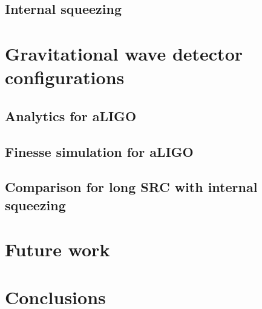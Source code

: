 \documentclass[pra,superscriptaddress,reprint,nofootinbib]{revtex4-1}
\begin{document}
\subsection{Internal squeezing}


\section{Gravitational wave detector configurations}
\subsection{Analytics for aLIGO}
\subsection{Finesse simulation for aLIGO}
\subsection{Comparison for long SRC with internal squeezing}


\section{Future work}
\label{sec:future_work}



\section{Conclusions}
\label{sec:conclusions}



\begin{acknowledgments}



\end{acknowledgments}


\appendix



\nocite{*}


\end{document}
